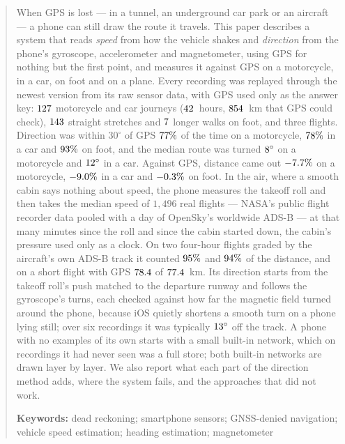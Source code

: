 \documentclass[11pt]{article}
\newcommand{\dg}{^\circ}
\begin{document}
\begin{abstract}\noindent
When GPS is lost --- in a tunnel, an underground car park or an aircraft --- a phone can still draw
the route it travels. This paper describes a system that reads \emph{speed} from how the vehicle
shakes and \emph{direction} from the phone's gyroscope, accelerometer and magnetometer, using GPS for
nothing but the first point, and measures it against GPS on a motorcycle, in a car, on foot and on a
plane. Every recording was replayed through the newest version from its raw sensor data, with GPS
used only as the answer key: $\nJourneys$ motorcycle and car journeys ($\nHours$~hours, $\nKmChecked$~km that GPS could
check), $\nWalkStretches$ straight stretches and $\nWalks$ longer walks on foot, and three flights. Direction was within
$30\dg$ of GPS $\nMotoWthirty\%$ of the time on a motorcycle, $\nCarWthirty\%$ in a car and $\nWalkWthirty\%$ on foot,
and the median route was turned $\nMotoRtMed\dg$ on a motorcycle and $\nCarRtMed\dg$ in a car. Against GPS, distance came out
$\nMotoDist\%$ on a motorcycle, $\nCarDist\%$ in a car and $\nWalkDist\%$ on foot. In the air, where a smooth cabin says nothing about speed, the phone measures
the takeoff roll and then takes the median speed of $1{,}496$ real flights --- NASA's public flight recorder
data pooled with a day of OpenSky's worldwide ADS-B --- at that many minutes since the roll and since the
cabin started down, the cabin's pressure used only as a clock. On two four-hour flights graded by the
aircraft's own ADS-B track it counted $\nAirLongShare\%$ and $\nAirRetShare\%$ of the distance, and on a short flight with GPS
$\nAirShortPooledKm$ of $\nAirShortKm$~km. Its direction starts from the takeoff roll's push matched to the departure
runway and follows the gyroscope's turns, each checked against how far the magnetic field turned around the phone,
because iOS quietly shortens a smooth turn on a phone lying still; over six recordings it was typically
$\nAirDirAll\dg$ off the track. A phone with no examples of its own starts with a small
built-in network, which on recordings it had never seen was \nNetVsStore{} a full store; both built-in
networks are drawn layer by layer. We also report what each part of the direction method adds, where the
system fails, and the approaches that did not work.

\medskip\noindent\textbf{Keywords:} dead reckoning; smartphone sensors; GNSS-denied navigation;
vehicle speed estimation; heading estimation; magnetometer
\end{abstract}
\end{document}
